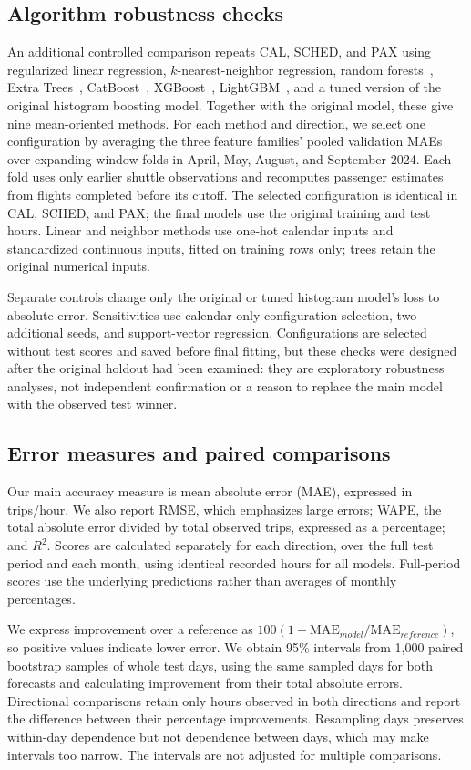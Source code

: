 \documentclass[preprint,12pt,times]{elsarticle}
\begin{document}
\subsection{Algorithm robustness checks}
\label{sec:algorithm_protocol}
An additional controlled comparison repeats CAL, SCHED, and PAX using regularized linear regression, $k$-nearest-neighbor regression, random forests~\cite{randomforest}, Extra Trees~\cite{extratrees}, CatBoost~\cite{catboost}, XGBoost~\cite{xgboost}, LightGBM~\cite{lightgbm}, and a tuned version of the original histogram boosting model. Together with the original model, these give nine mean-oriented methods. For each method and direction, we select one configuration by averaging the three feature families' pooled validation MAEs over expanding-window folds in April, May, August, and September 2024. Each fold uses only earlier shuttle observations and recomputes passenger estimates from flights completed before its cutoff. The selected configuration is identical in CAL, SCHED, and PAX; the final models use the original training and test hours. Linear and neighbor methods use one-hot calendar inputs and standardized continuous inputs, fitted on training rows only; trees retain the original numerical inputs.

Separate controls change only the original or tuned histogram model's loss to absolute error. Sensitivities use calendar-only configuration selection, two additional seeds, and support-vector regression. Configurations are selected without test scores and saved before final fitting, but these checks were designed after the original holdout had been examined: they are exploratory robustness analyses, not independent confirmation or a reason to replace the main model with the observed test winner.

\subsection{Error measures and paired comparisons}
Our main accuracy measure is mean absolute error (MAE), expressed in trips/hour. We also report RMSE, which emphasizes large errors; WAPE, the total absolute error divided by total observed trips, expressed as a percentage; and $R^2$. Scores are calculated separately for each direction, over the full test period and each month, using identical recorded hours for all models. Full-period scores use the underlying predictions rather than averages of monthly percentages.

We express improvement over a reference as $100(1-\mathrm{MAE}_{model}/\mathrm{MAE}_{reference})$, so positive values indicate lower error. We obtain 95\% intervals from 1,000 paired bootstrap samples of whole test days, using the same sampled days for both forecasts and calculating improvement from their total absolute errors. Directional comparisons retain only hours observed in both directions and report the difference between their percentage improvements. Resampling days preserves within-day dependence but not dependence between days, which may make intervals too narrow. The intervals are not adjusted for multiple comparisons.
\end{document}
